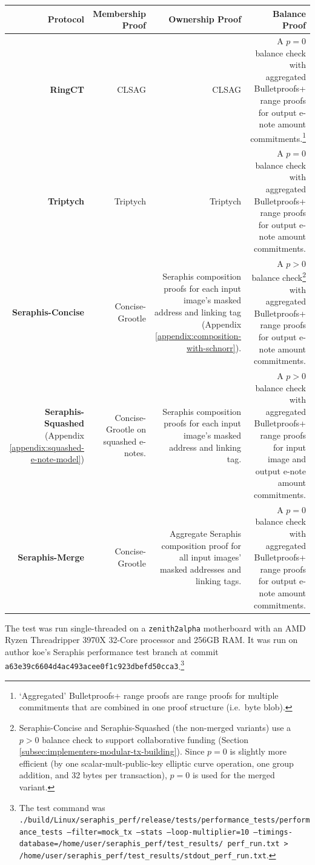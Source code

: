 \begin{tabularx}{\textwidth}{|R|R|R|R|}
\caption{Transaction Protocols Overview}
\label{table:efficiency-transaction-protocols-overview}\\
\hline
    \textbf{Protocol} & Membership Proof & Ownership Proof & Balance Proof \\
\hline\hline
    \textbf{RingCT} \cite{MRL-0005-ringct} & CLSAG \cite{clsag-eprint} & CLSAG & A $p = 0$ balance check with aggregated Bulletproofs+ range proofs \cite{bulletproofs_plus} for output e-note amount commitments.\footnote{`Aggregated' Bulletproofs+ range proofs are range proofs for multiple commitments that are combined in one proof structure (i.e.\ byte blob).} \\
\hline
    \textbf{Triptych} \cite{triptych-preprint} & Triptych & Triptych & A $p = 0$ balance check with aggregated Bulletproofs+ range proofs \cite{bulletproofs_plus} for output e-note amount commitments. \\
\hline
    \textbf{Seraphis-Concise} & Concise-Grootle & Seraphis composition proofs for each input image's masked address and linking tag (Appendix \ref{appendix:composition-with-schnorr}). & A $p > 0$ balance check\footnote{Seraphis-Concise and Seraphis-Squashed (the non-merged variants) use a $p > 0$ balance check to support collaborative funding (Section \ref{subsec:implementers-modular-tx-building}). Since $p = 0$ is slightly more efficient (by one scalar-mult-public-key elliptic curve operation, one group addition, and 32 bytes per transaction), $p = 0$ is used for the merged variant.} with aggregated Bulletproofs+ range proofs for output e-note amount commitments. \\
\hline
    \textbf{Seraphis-Squashed} (Appendix \ref{appendix:squashed-e-note-model}) & Concise-Grootle on squashed e-notes. & Seraphis composition proofs for each input image's masked address and linking tag. & A $p > 0$ balance check with aggregated Bulletproofs+ range proofs for input image and output e-note amount commitments.  \\
\hline
    \textbf{Seraphis-Merge} & Concise-Grootle & Aggregate Seraphis composition proof for all input images' masked addresses and linking tags. & A $p = 0$ balance check with aggregated Bulletproofs+ range proofs for output e-note amount commitments. \\
\hline
\end{tabularx}

The test was run single-threaded on a {\tt zenith2alpha} motherboard with an AMD Ryzen Threadripper 3970X 32-Core processor and 256GB RAM. It was run on author koe's Seraphis performance test branch \cite{seraphis-perf-branch} at commit {\tt a63e39c6604d4ac493acee0f1c923dbefd50cca3}.\footnote{The test command was {\tt ./build/Linux/seraphis\_perf/release/tests/performance\_tests/performance\_tests --filter=\*mock\_tx\* --stats --loop-multiplier=10 --timings-database=/home/user/seraphis\_perf/test\_results/ perf\_run.txt > /home/user/seraphis\_perf/test\_results/stdout\_perf\_run.txt}.}

